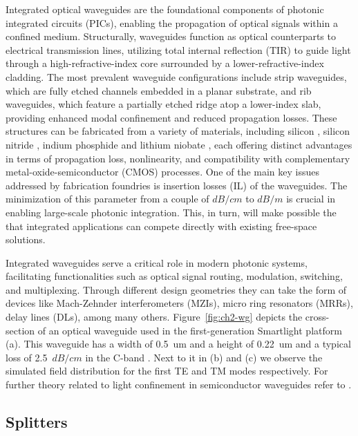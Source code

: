 Integrated optical waveguides are the foundational components of photonic integrated circuits (PICs), enabling the propagation of optical signals within a confined medium.
Structurally, waveguides function as optical counterparts to electrical transmission lines, utilizing total internal reflection (TIR) to guide light through a high-refractive-index core surrounded by a lower-refractive-index cladding.
The most prevalent waveguide configurations include strip waveguides, which are fully etched channels embedded in a planar substrate, and rib waveguides, which feature a partially etched ridge atop a lower-index slab, providing enhanced modal confinement and reduced propagation losses.
These structures can be fabricated from a variety of materials, including silicon \cite{siew_review_2021}, silicon nitride \cite{xiang_silicon_2022}, indium phosphide \cite{smit_past_2019} and lithium niobate \cite{boes_lithium_2023}, each offering distinct advantages in terms of propagation loss, nonlinearity, and compatibility with complementary metal-oxide-semiconductor (CMOS) processes.
One of the main key issues addressed by fabrication foundries is insertion losses (IL) of the waveguides.
The minimization of this parameter from a couple of \(dB/cm\) to \(dB/m\) is crucial in enabling large-scale photonic integration.
This, in turn, will make possible the that integrated applications can compete directly with existing free-space solutions.

Integrated waveguides serve a critical role in modern photonic systems, facilitating functionalities such as optical signal routing, modulation, switching, and multiplexing.
Through different design geometries they can take the form of devices like Mach-Zehnder interferometers (MZIs), micro ring resonators (MRRs), delay lines (DLs), among many others.
Figure~\ref{fig:ch2-wg} depicts the cross-section of an optical waveguide used in the first-generation Smartlight platform (a).
This waveguide has a width of 0.5~um and a height of 0.22~um and a typical loss of 2.5~\(dB/cm\) in the C-band \cite{perez-lopez_general-purpose_2024}.
Next to it in (b) and (c) we observe the simulated field distribution for the first TE and TM modes respectively.
For further theory related to light confinement in semiconductor waveguides refer to \cite{chrostowski_silicon_2015,saleh_guided-wave_1991}.

\subsection{Splitters}\label{sub:splitters} %

